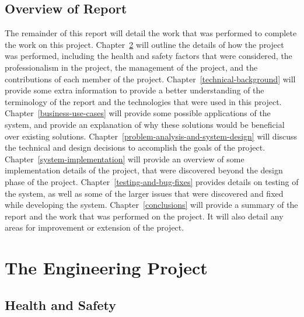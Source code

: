 \documentclass[12pt]{report}
\let\Oldsection\section
\renewcommand{\section}{\FloatBarrier\Oldsection}
\begin{document}
\section{Overview of Report} \label{overview-of-report}

The remainder of this report will detail the work that was performed to complete the work on this project.
Chapter~\ref{the-engineering-project} will outline the details of how the project was performed, including
the health and safety factors that were considered, the professionalism in the project, the management of
the project, and the contributions of each member of the project.
Chapter~\ref{technical-background} will provide some extra information to provide a better understanding of
the terminology of the report and the technologies that were used in this project.
Chapter~\ref{business-use-cases} will provide some possible applications of the system, and provide an explanation
of why these solutions would be beneficial over existing solutions.
Chapter~\ref{problem-analysis-and-system-design} will discuss the technical and design decisions to accomplish the
goals of the project.
Chapter~\ref{system-implementation} will provide an overview of some implementation details of the project, that were
discovered beyond the design phase of the project.
Chapter~\ref{testing-and-bug-fixes} provides details on testing of the system, as well as some of the larger issues that
were discovered and fixed while developing the system.
Chapter~\ref{conclusions} will provide a summary of the report and the work that was performed on the project.
It will also detail any areas for improvement or extension of the project.





\chapter{The Engineering Project} \label{the-engineering-project}


\section{Health and Safety} \label{health-and-safety}
\end{document}
